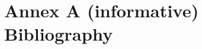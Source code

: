 \documentclass[journal,10pt,onecolumn,compsoc]{IEEEtran} \usepackage[margin=1.0in]{geometry} \usepackage{pdfpages}
\begin{document}

\newpage
\section*{Annex A (informative) Bibliography}
\begingroup
\renewcommand{\section}[2]{}


\endgroup

\end{document}
